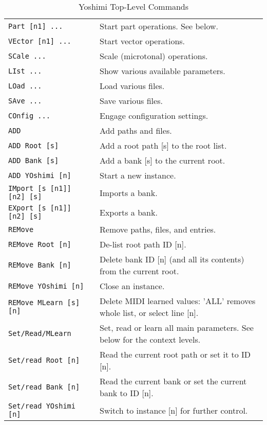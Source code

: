 \begin{center}
\begin{longtable}{p{6cm} p{10cm}}
\caption[Yoshimi Top-Level Commands]{Yoshimi Top-Level Commands} \\

\texttt{Part [n1] ...} &
   Start part operations.  See below. \\
\texttt{VEctor [n1] ...} &
   Start vector operations. \\
\texttt{SCale ...} &
   Scale (microtonal) operations. \\
\texttt{LIst ...} &
   Show various available parameters. \\
\texttt{LOad ...} &
   Load various files. \\
\texttt{SAve ...} &
   Save various files. \\
\texttt{COnfig ...} &
   Engage configuration settings. \\
\texttt{ADD} &
   Add paths and files. \\
\texttt{ADD Root [s]} &
   Add a root path [s] to the root list. \\
\texttt{ADD Bank [s]} &
   Add a bank [s] to the current root. \\
\texttt{ADD YOshimi [n]} &
   Start a new instance. \\
\texttt{IMport [s [n1]] [n2] [s]} &
   Imports a bank. \\
\texttt{EXport [s [n1]] [n2] [s]} &
   Exports a bank. \\
\texttt{REMove} &
   Remove paths, files, and entries. \\
\texttt{REMove Root [n]} &
   De-list root path ID [n]. \\
\texttt{REMove Bank [n]} &
   Delete bank ID [n] (and all its contents) from the current root. \\
\texttt{REMove YOshimi [n]} &
   Close an instance. \\
\texttt{REMove MLearn [s] [n]} &
   Delete MIDI learned values: 'ALL' removes whole list, or select line [n]. \\
\texttt{Set/Read/MLearn} &
   Set, read or learn all main parameters. See below for the context levels. \\
\texttt{Set/read Root [n]} &
   Read the current root path or set it to ID [n]. \\
\texttt{Set/read Bank [n]} &
   Read the current bank or set the current bank to ID [n]. \\
\texttt{Set/read YOshimi [n]}&
   Switch to instance [n] for further control. \\

\end{longtable}
\end{center}
